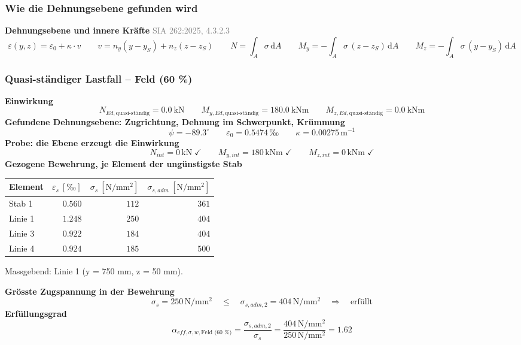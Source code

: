 \documentclass[11pt,a4paper]{article}
\newcommand{\normref}[1]{{\small\textcolor{gray}{#1}}}
\begin{document}
\subsubsection{Wie die Dehnungsebene gefunden wird}
\noindent\textbf{Dehnungsebene und innere Kräfte} \hfill \normref{SIA 262:2025, 4.3.2.3}
\begin{equation*}
\varepsilon(y, z) = \varepsilon_0 + \kappa \cdot v \qquad v = n_y (y - y_S) + n_z (z - z_S) \qquad N = \int_A \sigma\,\mathrm{d}A \qquad M_y = -\int_A \sigma\,(z - z_S)\,\mathrm{d}A \qquad M_z = -\int_A \sigma\,(y - y_S)\,\mathrm{d}A
\end{equation*}
\subsubsection{Quasi-ständiger Lastfall – Feld (60 \%)}
\noindent\textbf{Einwirkung}
\begin{equation*}
N_{Ed,\text{quasi-ständig}} = 0.0\ \mathrm{kN} \qquad M_{y,Ed,\text{quasi-ständig}} = 180.0\ \mathrm{kNm} \qquad M_{z,Ed,\text{quasi-ständig}} = 0.0\ \mathrm{kNm}
\end{equation*}
\noindent\textbf{Gefundene Dehnungsebene: Zugrichtung, Dehnung im Schwerpunkt, Krümmung}
\begin{equation*}
\psi = -89.3^\circ \qquad \varepsilon_0 = 0.5474\,\text{‰} \qquad \kappa = 0.00275\,\mathrm{m}^{-1}
\end{equation*}
\noindent\textbf{Probe: die Ebene erzeugt die Einwirkung}
\begin{equation*}
N_{int} = 0\,\mathrm{kN} \;\checkmark \qquad M_{y,int} = 180\,\mathrm{kNm} \;\checkmark \qquad M_{z,int} = 0\,\mathrm{kNm} \;\checkmark
\end{equation*}
\noindent\textbf{Gezogene Bewehrung, je Element der ungünstigste Stab}
\begin{longtable}{lrrr}
\hline
Element & $\varepsilon_s\ [‰]$ & $\sigma_s\ [\mathrm{N/mm^2}]$ & $\sigma_{s,adm}\ [\mathrm{N/mm^2}]$ \\
\hline
\endhead
Stab 1 & $0.560$ & $112$ & $361$ \\
Linie 1 & $1.248$ & $250$ & $404$ \\
Linie 3 & $0.922$ & $184$ & $404$ \\
Linie 4 & $0.924$ & $185$ & $500$ \\
\hline
\end{longtable}
Massgebend: Linie 1 (y = 750 mm, z = 50 mm).

\noindent\textbf{Grösste Zugspannung in der Bewehrung}
\begin{equation*}
\sigma_s = 250\,\mathrm{N}/\mathrm{mm}^{2} \quad \le \quad \sigma_{s,adm,2} = 404\,\mathrm{N}/\mathrm{mm}^{2} \quad \Rightarrow \quad \text{erfüllt}
\end{equation*}
\noindent\textbf{Erfüllungsgrad}
\begin{equation*}
\alpha_{eff,\sigma,w,\text{Feld (60 \%)}} = \frac{\sigma_{s,adm,2}}{\sigma_s} = \frac{404\,\mathrm{N}/\mathrm{mm}^{2}}{250\,\mathrm{N}/\mathrm{mm}^{2}} = 1.62
\end{equation*}
\end{document}
